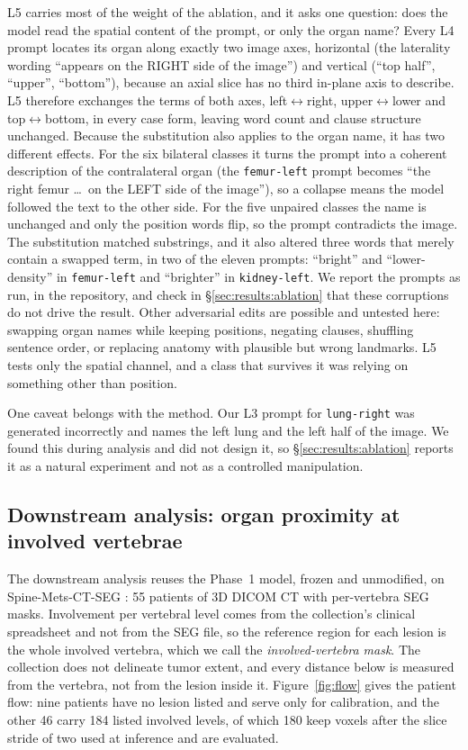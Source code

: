 \documentclass[10pt]{article}
\newcommand{\org}[1]{\texttt{#1}}
\begin{document}
L5 carries most of the weight of the ablation, and it asks one question: does the
model read the spatial content of the prompt, or only the organ name? Every L4
prompt locates its organ along exactly two image axes, horizontal (the laterality
wording ``appears on the RIGHT side of the image'') and vertical (``top half'',
``upper'', ``bottom''), because an axial slice has no third in-plane axis to
describe. L5 therefore exchanges the terms of both axes, left$\leftrightarrow$right,
upper$\leftrightarrow$lower and top$\leftrightarrow$bottom, in every case form,
leaving word count and clause structure unchanged. Because the substitution also
applies to the organ name, it has two different effects. For the six bilateral
classes it turns the prompt into a coherent description of the contralateral organ
(the \org{femur-left} prompt becomes ``the right femur \ldots\ on the LEFT side of
the image''), so a collapse means the model followed the text to the other side.
For the five unpaired classes the name is unchanged and only the position words
flip, so the prompt contradicts the image. The substitution matched substrings,
and it also altered three words that merely contain a swapped term, in two of the
eleven prompts: ``bright'' and ``lower-density'' in \org{femur-left} and
``brighter'' in \org{kidney-left}. We report the prompts as run, in the
repository, and check in \S\ref{sec:results:ablation} that these corruptions do
not drive the result. Other adversarial edits are possible and untested here:
swapping organ names while keeping positions, negating clauses, shuffling
sentence order, or replacing anatomy with plausible but wrong landmarks. L5 tests
only the spatial channel, and a class that survives it was relying on something
other than position.

One caveat belongs with the method. Our L3 prompt for \org{lung-right} was
generated incorrectly and names the left lung and the left half of the image. We
found this during analysis and did not design it, so \S\ref{sec:results:ablation}
reports it as a natural experiment and not as a controlled manipulation.

\subsection{Downstream analysis: organ proximity at involved vertebrae}
\label{sec:methods:index}

The downstream analysis reuses the Phase~1 model, frozen and unmodified, on
Spine-Mets-CT-SEG \cite{pieper2024spinemets}: 55 patients of 3D DICOM CT with
per-vertebra SEG masks. Involvement per vertebral level comes from the
collection's clinical spreadsheet and not from the SEG file, so the reference
region for each lesion is the whole involved vertebra, which we call the
\emph{involved-vertebra mask}. The collection does not delineate tumor extent,
and every distance below is measured from the vertebra, not from the lesion
inside it. Figure~\ref{fig:flow} gives the patient flow: nine patients have no
lesion listed and serve only for calibration, and the other 46 carry 184 listed
involved levels, of which 180 keep voxels after the slice stride of two used at
inference and are evaluated.
\end{document}
